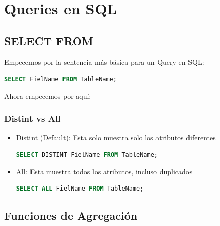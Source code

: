 \documentclass[12pt, fleqn]{report}                             %
\begin{document}
    \chapter{Queries en SQL}
    \clearpage

        \section{SELECT FROM}

            Empecemos por la sentencia más básica para un Query en SQL:

            \begin{lstlisting}[language=SQL, gobble=16]
                SELECT FielName FROM TableName;
            \end{lstlisting}

            Ahora empecemos por aquí:
            \subsection{Distint vs All}
            \begin{itemize}
                \item Distint (Default):
                    Esta solo muestra solo los atributos diferentes

                    \begin{lstlisting}[language=SQL, gobble=24]
                        SELECT DISTINT FielName FROM TableName;
                    \end{lstlisting}
                \item All:
                    Esta muestra todos los atributos, incluso duplicados
                    \begin{lstlisting}[language=SQL, gobble=24]
                        SELECT ALL FielName FROM TableName;
                    \end{lstlisting}
            \end{itemize}



        \section{Funciones de Agregación}
\end{document}
